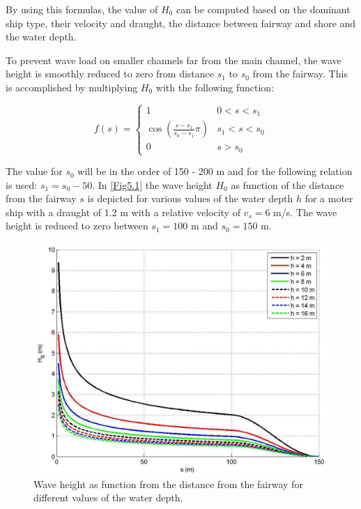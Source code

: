 By using this formulas, the value of $H_0$ can be computed based on the dominant ship type, their velocity and draught, the distance between fairway and shore and the water depth.

To prevent wave load on smaller channels far from the main channel, the wave height is smoothly reduced to zero from distance $s_1$ to $s_0$ from the fairway.
This is accomplished by multiplying $H_0$ with the following function:

\begin{equation}
f(s) = \left \{ \begin{matrix}
1 & 0 < s < s_1 \\
\cos \left ( \frac{s - s_1}{s_0 - s_1} \pi \right ) & s_1 < s < s_0 \\
0 & s > s_0
\end{matrix} \right .
\end{equation}

The value for $s_0$ will be in the order of 150 - 200 m and for  the following relation is used: $s_1 = s_0 - 50$.
In \autoref{Fig5.1} the wave height $H_0$ as function of the distance from the fairway $s$ is depicted for various values of the water depth $h$ for a moter ship with a draught of 1.2 m with a relative velocity of $v_s = 6$ m/s.
The wave height is reduced to zero between $s_1 = 100$ m and $s_0 = 150$ m.

\begin{figure}
\includegraphics[width=\textwidth]{figures/Fig5-1.png}
\caption{Wave height as function from the distance from the fairway for different values of the water depth.}
\label{Fig5.1}
\end{figure}
